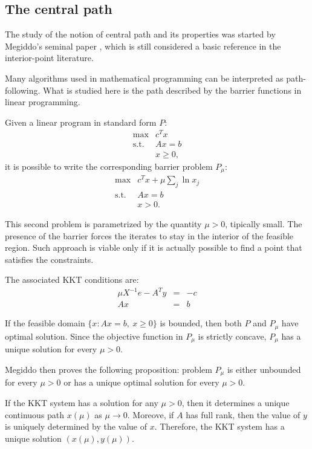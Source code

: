 %
%
\subsection{The central path}

The study of the notion of central path and its properties was started by
Megiddo's seminal paper \cite{Megiddo}, which is still considered a basic 
reference in the interior-point literature.

Many algorithms used in mathematical programming can be interpreted as path-following. What is studied here is the path described by the barrier functions in linear programming.

Given a linear program in standard form $P$:
\[
\begin{array}{rl}
  \max        & c^Tx \\
  \mbox{s.t.} & Ax = b \\
              & x \ge 0,
\end{array}
\]
it is possible to write the corresponding barrier problem $P_\mu$:
\[
\begin{array}{rl}
  \max        & c^Tx + \mu \sum_j \ln x_j \\
  \mbox{s.t.} & Ax = b \\
              & x > 0.
\end{array}
\]

This second problem is parametrized by the quantity $\mu > 0$, 
tipically small. The presence of the barrier forces the iterates 
to stay in the interior of the feasible region. Such approach is 
viable only if it is actually possible to find a point that 
satisfies the constraints.

The associated KKT conditions are:
\[
\begin{array}{lcc}
  \mu X^{-1}e -A^Ty & = & -c \\
   Ax               & = &  b
\end{array}
\]

If the feasible domain $\{ x: Ax=b,\: x\ge 0 \}$ is bounded, 
then both $P$ and $P_\mu$ have optimal solution. Since the 
objective function in $P_\mu$ is strictly concave, $P_\mu$ 
has a unique solution for every $\mu>0$.

Megiddo then proves the following proposition: problem $P_\mu$ 
is either unbounded for every  $\mu>0$ or has a unique optimal 
solution for every $\mu>0$.

If the KKT system has a solution for any $\mu>0$, then it 
determines a unique continuous path $x(\mu)$ as $\mu\to 0$. 
Moreove, if $A$ has full rank, then the value of $y$ is 
uniquely determined by the value of $x$. Therefore, the KKT 
system has a unique solution $(x(\mu),y(\mu))$.

